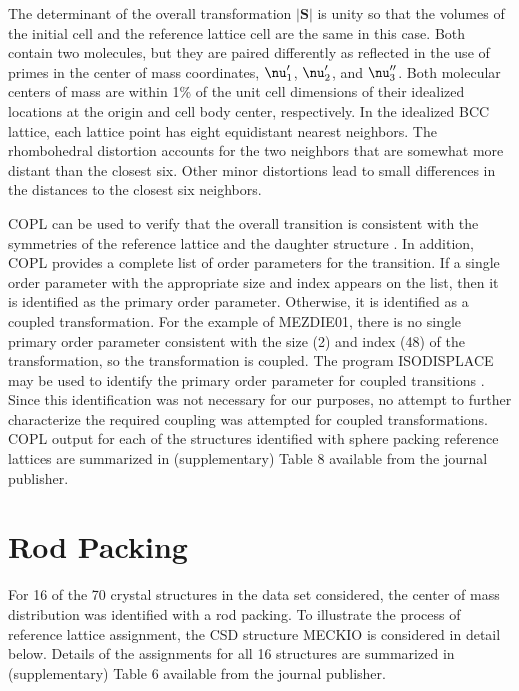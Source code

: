 \documentclass[preprint]{iucr}              %
\begin{document}
The determinant of the overall transformation $|\mathbf{S}|$ is unity so that the volumes of the initial cell and the reference lattice cell are the same in this case.  Both contain two molecules, but they are paired differently as reflected in the use of primes in the center of mass coordinates, 
$\mbox{\boldmath$\nu$}_{1}^{\prime}$, 
$\mbox{\boldmath$\nu$}_{2}^{\prime}$, and
$\mbox{\boldmath$\nu$}_{3}^{\prime\prime}$.
Both molecular centers of mass are within 1\% of the unit cell dimensions of their idealized locations at the origin and cell body center, respectively.  In the idealized BCC lattice, each lattice point has eight equidistant nearest neighbors.  The rhombohedral distortion accounts for the two neighbors that are somewhat more distant than the closest six.  Other minor distortions lead to small differences in the distances to the closest six neighbors.

COPL can be used to verify that the overall transition is consistent with the
symmetries of the reference lattice and the daughter structure \cite{Stokes07}.
In addition, COPL provides a complete list of order parameters for the transition.  If a single order parameter with the appropriate size and index appears on the list, then it is identified as the primary order parameter.  Otherwise, it is identified as a coupled transformation.  For the example of MEZDIE01, there is no single primary order parameter consistent with the size (2) and index (48) of the transformation, so the transformation is coupled.  The program ISODISPLACE may be used to identify the primary order parameter for coupled transitions \cite{ISODISPLACE06}.  Since this identification was not necessary for our purposes, no attempt to further characterize the required coupling was attempted for coupled transformations.  COPL output for each of the structures identified with sphere packing reference lattices are summarized in (supplementary) Table 8 available from the journal publisher.


\section{Rod Packing }

For 16 of the 70 crystal structures in the data set considered, the center of mass distribution was identified with a rod packing.  To illustrate the process of reference lattice assignment, the CSD structure MECKIO is considered in detail below.  Details of the assignments for all 16 structures are summarized in (supplementary) Table 6 available from the journal publisher.
\end{document}
